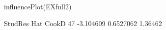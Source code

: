 \begin{Schunk}
\begin{Sinput}
 influencePlot(EXfull2)
\end{Sinput}
\begin{Soutput}
     StudRes       Hat   CookD
47 -3.104609 0.6527062 1.36462
\end{Soutput}
\end{Schunk}
